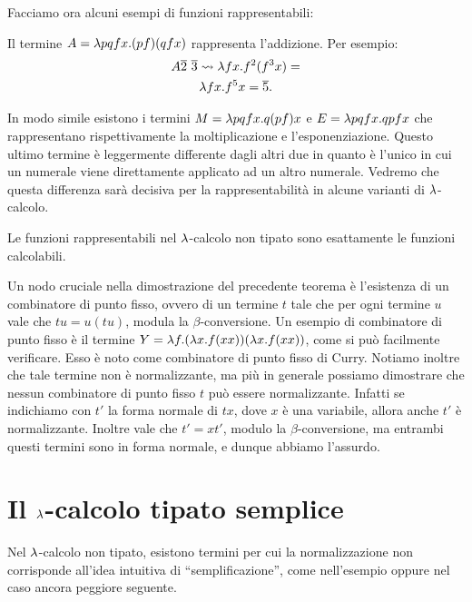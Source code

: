 \documentclass[]{marticle}
\begin{document}
Facciamo ora alcuni esempi di funzioni rappresentabili:
\begin{block}[Esempio]
    Il termine $A = \lambda pq fx. (pf)(qfx)$ rappresenta l'addizione. Per esempio:
    \begin{gather*}
        A\overline{2}\ \overline{3} \rightsquigarrow \lambda fx. f^2 (f^3 x) = \\
        \lambda fx. f^5 x = \overline{5}.
    \end{gather*}

    In modo simile esistono i termini $M = \lambda p q f x. q (p f) x$ e $E = \lambda p q
    f x. qpfx$ che rappresentano rispettivamente la moltiplicazione e
    l'esponenziazione. Questo ultimo termine \`e leggermente differente dagli
    altri due in quanto \`e l'unico in cui un numerale viene direttamente
    applicato ad un altro numerale. Vedremo che questa differenza sar\`a
    decisiva per la rappresentabilit\`a in alcune varianti di $\lambda$-calcolo.
\end{block}

\begin{block}[Teorema]
    Le funzioni rappresentabili nel $\lambda$-calcolo non tipato sono esattamente le
    funzioni calcolabili.
\end{block}

Un nodo cruciale nella dimostrazione del precedente teorema \`e l'esistenza di
un combinatore di punto fisso, ovvero di un termine $t$ tale che per ogni
termine $u$ vale che $tu = u(tu)$, modula la $\beta$-conversione. Un esempio di
combinatore di punto fisso \`e il termine $Y = \lambda f. (\lambda x. f(xx))(\lambda x.
f(xx))$, come si pu\`o facilmente verificare. Esso \`e noto come combinatore di
punto fisso di Curry. Notiamo inoltre che tale termine non \`e normalizzante, ma
pi\`u in generale possiamo dimostrare che nessun combinatore di punto fisso $t$
pu\`o essere normalizzante.  Infatti se indichiamo con $t'$ la forma normale di
$tx$, dove $x$ \`e una variabile, allora anche $t'$ \`e normalizzante. Inoltre
vale che $t' = xt'$, modulo la $\beta$-conversione, ma entrambi questi termini
sono in forma normale, e dunque abbiamo l'assurdo.

\section{Il $\lambda$-calcolo tipato semplice}

Nel $\lambda$-calcolo non tipato, esistono termini per cui la normalizzazione non
corrisponde all'idea intuitiva di ``semplificazione'', come
nell'esempio  oppure nel caso ancora peggiore seguente.
\end{document}
